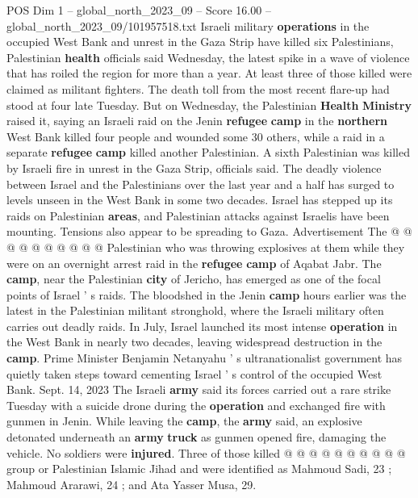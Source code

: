 \begin{textsample}{POS Dim 1 – global\_north\_2023\_09 – Score 16.00 – global\_north\_2023\_09/101957518.txt}  \label{ex:f1_pos_353}
Israeli military \textbf{operations} in the occupied West Bank and unrest in the Gaza Strip have killed six Palestinians, Palestinian \textbf{health} officials said Wednesday, the latest spike in a wave of violence that has roiled the region for more than a year.
At least three of those killed were claimed as militant fighters.
The death toll from the most recent flare-up had stood at four late Tuesday.
But on Wednesday, the Palestinian \textbf{Health} \textbf{Ministry} raised it, saying an Israeli raid on the Jenin \textbf{refugee} \textbf{camp} in the \textbf{northern} West Bank killed four people and wounded some 30 others, while a raid in a separate \textbf{refugee} \textbf{camp} killed another Palestinian.
A sixth Palestinian was killed by Israeli fire in unrest in the Gaza Strip, officials said.
The deadly violence between Israel and the Palestinians over the last year and a half has surged to levels unseen in the West Bank in some two decades.
Israel has stepped up its raids on Palestinian \textbf{areas}, and Palestinian attacks against Israelis have been mounting.
Tensions also appear to be spreading to Gaza.
Advertisement The @ @ @ @ @ @ @ @ @ @ Palestinian who was throwing explosives at them while they were on an overnight arrest raid in the \textbf{refugee} \textbf{camp} of Aqabat Jabr.
The \textbf{camp}, near the Palestinian \textbf{city} of Jericho, has emerged as one of the focal points of Israel ' s raids.
The bloodshed in the Jenin \textbf{camp} hours earlier was the latest in the Palestinian militant stronghold, where the Israeli military often carries out deadly raids.
In July, Israel launched its most intense \textbf{operation} in the West Bank in nearly two decades, leaving widespread destruction in the \textbf{camp}.
Prime Minister Benjamin Netanyahu ' s ultranationalist government has quietly taken steps toward cementing Israel ' s control of the occupied West Bank.
Sept. 14, 2023 The Israeli \textbf{army} said its forces carried out a rare strike Tuesday with a suicide drone during the \textbf{operation} and exchanged fire with gunmen in Jenin.
While leaving the \textbf{camp}, the \textbf{army} said, an explosive detonated underneath an \textbf{army} \textbf{truck} as gunmen opened fire, damaging the vehicle.
No soldiers were \textbf{injured}.
Three of those killed @ @ @ @ @ @ @ @ @ @ group or Palestinian Islamic Jihad and were identified as Mahmoud Sadi, 23 ; Mahmoud Ararawi, 24 ; and Ata Yasser Musa, 29.

\end{textsample}
